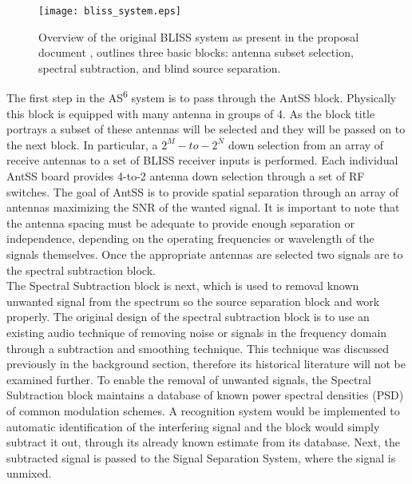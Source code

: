 \begin{figure}[!ht]\label{bliss_system}
\hspace{0.2in}
\texttt{[image: bliss\_system.eps]}
\caption{Overview of the original BLISS system as present in the proposal document \cite{onr_original}, outlines three basic blocks: antenna subset selection, spectral subtraction, and blind source separation.}
\end{figure}

The first step in the AS\textsuperscript{6} system is to pass through the AntSS block.  Physically this block is equipped with many antenna in groups of 4.  As the block title portrays a subset of these antennas will be selected and they will be passed on to the next block.  In particular, a \(2^{M}-to-2^{N}\) down selection from an array of receive antennas to a set of BLISS receiver inputs is performed. Each individual AntSS board provides 4-to-2 antenna down selection through a set of RF switches.  The goal of AntSS is to provide spatial separation through an array of antennas maximizing the SNR of the wanted signal.  It is important to note that the antenna spacing must be adequate to provide enough separation or independence, depending on the operating frequencies or wavelength of the signals themselves.  Once the appropriate antennas are selected two signals are to the spectral subtraction block.\\

The Spectral Subtraction block is next, which is used to removal known unwanted signal from the spectrum so the source separation block and work properly.  The original design of the spectral subtraction block is to use an existing audio technique of removing noise or signals in the frequency domain through a subtraction and smoothing technique.  This technique was discussed previously in the background section, therefore its historical literature will not be examined further.  To enable the removal of unwanted signals, the Spectral Subtraction block maintains a database of known power spectral densities (PSD) of common modulation schemes.  A recognition system would be implemented to automatic identification of the interfering signal and the block would simply subtract it out, through its already known estimate from its database.  Next, the subtracted signal is passed to the Signal Separation System, where the signal is unmixed.\\

